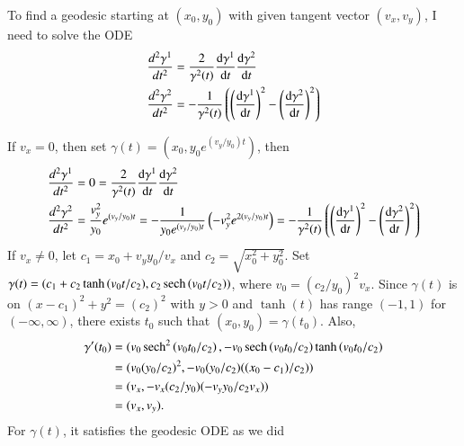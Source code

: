 \documentclass[a4paper, 12pt]{article}
\theoremstyle{Mydefinition}
\theoremstyle{Mytheorem}
\begin{document}
To find a geodesic starting at $(x_0,y_0)$ with given tangent vector $(v_x, v_y)$, I need to solve the ODE
\begin{equation*}
    \begin{split}
        \frac{d^2\gamma^1}{dt^2} &= \frac{2}{\gamma^2(t)} \dv{\gamma^1}{t}\dv{\gamma^2}{t}\\
        \frac{d^2\gamma^2}{dt^2} &= -\frac{1}{\gamma^2(t)}\left(\left(\dv{\gamma^1}{t}\right)^2-\left(\dv{\gamma^2}{t}\right)^2\right)\\
    \end{split}
\end{equation*}

If $v_x = 0$, then set $\gamma(t) = (x_0, y_0e^{(v_y/y_0)t})$, then 
\begin{equation*}
\begin{split}
     \frac{d^2\gamma^1}{dt^2} &= 0 =\frac{2}{\gamma^2(t)} \dv{\gamma^1}{t}\dv{\gamma^2}{t}\\
     \frac{d^2\gamma^2}{dt^2} &= \frac{v_y^2}{y_0}e^{(v_y/y_0)t} = -\frac{1}{y_0e^{(v_y/y_0)t}}\left(-v_y^2 e^{2(v_y/y_0)t}\right) = -\frac{1}{\gamma^2(t)}\left(\left(\dv{\gamma^1}{t}\right)^2-\left(\dv{\gamma^2}{t}\right)^2\right)
\end{split}
\end{equation*}
If $v_x\neq 0$, let $c_1 = x_0+v_yy_0/v_x$ and $c_2 = \sqrt{x_0^2+y_0^2}$. Set $\gamma(t) = (c_1 + c_2\tanh{\left(v_0t/c_2\right)}, c_2\sech{\left(v_0t/c_2\right)})$, where $v_0 = (c_2/y_0)^2v_x$. Since $\gamma(t)$ is on $(x-c_1)^2+y^2 = (c_2)^2$ with $y>0$ and $\tanh(t)$ has range $(-1,1)$ for $(-\infty, \infty)$, there exists $t_0$ such that $(x_0, y_0) = \gamma(t_0)$. Also, 
\begin{equation*}
\begin{split}
    \gamma'(t_0) &= (v_0\sech^2\left(v_0t_0/c_2\right), -v_0\sech\left(v_0t_0/c_2\right)\tanh\left(v_0t_0/c_2\right)\\
    &=(v_0(y_0/c_2)^2, -v_0(y_0/c_2)((x_0-c_1)/c_2))\\
    &=(v_x, -v_x(c_2/y_0)(-v_yy_0/c_2v_x))\\
    &=(v_x, v_y).
\end{split}
\end{equation*}
For $\gamma(t)$, it satisfies the geodesic ODE as we did 
\end{document}
